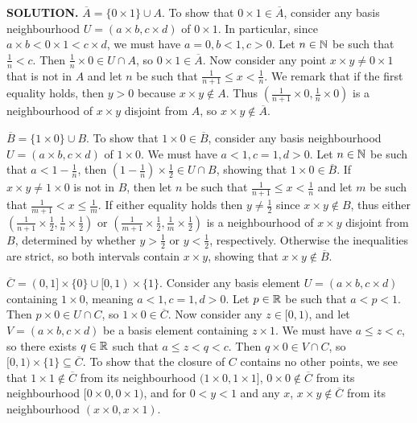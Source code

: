 \documentclass{article}
\begin{document}
\begin{enumerate}
    {\bf SOLUTION.} $\overline{A} = \{0 \times 1\} \cup A$. To show that $0 \times 1 \in \overline{A}$, consider any basis neighbourhood $U = (a \times b, c \times d)$ of $0 \times 1$. In particular, since $a \times b < 0 \times 1 < c \times d$, we must have $a = 0, b < 1, c > 0$. Let $n \in \mathbb{N}$ be such that $\frac1n < c$. Then $\frac1n \times 0 \in U \cap A$, so $0 \times 1 \in \overline{A}$. Now consider any point $x \times y \neq 0 \times 1$ that is not in $A$ and let $n$ be such that $\frac{1}{n+1} \leq x < \frac1n$. We remark that if the first equality holds, then $y > 0$ because $x \times y \notin A$. Thus $(\frac{1}{n+1} \times 0, \frac1n \times 0)$ is a neighbourhood of $x \times y$ disjoint from $A$, so $x \times y \notin \overline{A}$.
    
    $\overline{B} = \{1 \times 0\} \cup B$. To show that $1 \times 0 \in \overline{B}$, consider any basis neighbourhood $U = (a \times b, c \times d)$ of $1 \times 0$. We must have $a < 1, c = 1, d > 0$. Let $n \in \mathbb{N}$ be such that $a < 1 - \frac1n$, then $\left(1 - \frac1n \right) \times \frac12 \in U \cap B$, showing that $1 \times 0 \in \overline{B}$. If $x \times y \neq 1 \times 0$ is not in $B$, then let $n$ be such that $\frac{1}{n+1} \leq x < \frac1n$ and let $m$ be such that $\frac{1}{m+1} < x \leq \frac1m$. If either equality holds then $y \neq \frac12$ since $x \times y \notin B$, thus either $(\frac{1}{n+1} \times \frac12, \frac1n \times \frac12)$ or $(\frac{1}{m+1} \times \frac12, \frac1m \times \frac12)$ is a neighbourhood of $x \times y$ disjoint from $B$, determined by whether $y > \frac12$ or $y < \frac12$, respectively. Otherwise the inequalities are strict, so both intervals contain $x \times y$, showing that $x \times y \notin \overline{B}$.

    $\overline{C} = (0, 1] \times \{0\} \cup [0, 1) \times \{1\}$. Consider any basis element $U = (a \times b, c \times d)$ containing $1 \times 0$, meaning $a < 1, c = 1, d > 0.$ Let $p \in \mathbb{R}$ be such that $a < p < 1$. Then $p \times 0 \in U \cap C$, so $1 \times 0 \in \overline{C}$. Now consider any $z \in [0, 1)$, and let $V = (a \times b, c \times d)$ be a basis element containing $z \times 1$. We must have $a \leq z < c$, so there exists $q \in \mathbb{R}$ such that $a \leq z < q < c$. Then $q \times 0 \in V \cap C$, so $[0, 1) \times \{1\} \subseteq \overline{C}$. To show that the closure of $C$ contains no other points, we see that $1 \times 1 \notin \overline{C}$ from its neighbourhood $(1 \times 0, 1 \times 1]$, $0 \times 0 \notin \overline{C}$ from its neighbourhood $[0 \times 0, 0 \times 1)$, and for $0 < y < 1$ and any $x$, $x \times y \notin \overline{C}$ from its neighbourhood $(x \times 0, x \times 1)$.


\end{enumerate}
\end{document}
